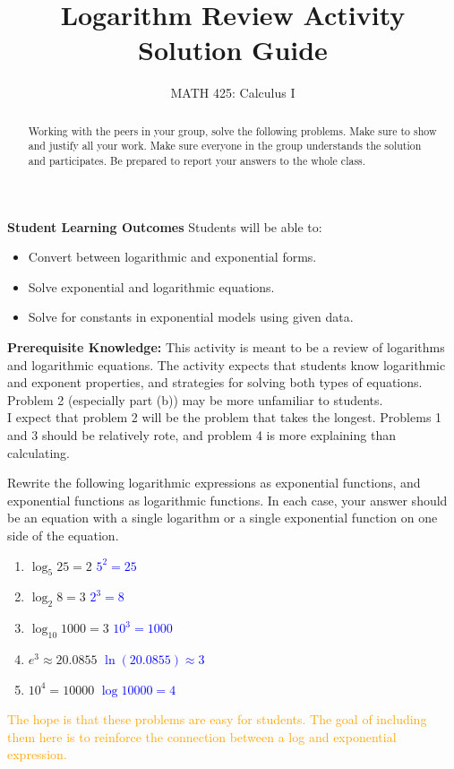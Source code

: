 \documentclass{ximera}
\title{Logarithm Review Activity Solution Guide}
\author{MATH 425: Calculus I}
\begin{document}
\begin{abstract}
   Working with the peers in your group, solve the following problems. Make sure to show and justify all your work. Make sure everyone in the group understands the solution and participates. Be prepared to report your answers to the whole class. 
\end{abstract}
\maketitle

\textbf{Student Learning Outcomes}
Students will be able to: 
    \begin{itemize}
        \item Convert between logarithmic and exponential forms.
        \item Solve exponential and logarithmic equations.
        \item Solve for constants in exponential models using given data.
    \end{itemize}

\textbf{Prerequisite Knowledge:} This activity is meant to be a review of logarithms and logarithmic equations.  The activity expects that students know logarithmic and exponent properties, and strategies for solving both types of equations.  Problem 2 (especially part (b)) may be more unfamiliar to students.\\

I expect that problem 2 will be the problem that takes the longest.  Problems 1 and 3 should be relatively rote, and problem 4 is more explaining than calculating.

\begin{exercise}
    Rewrite the following logarithmic expressions as exponential functions, and exponential functions as logarithmic functions.  In each case, your answer should be an equation with a single logarithm or a single exponential function on one side of the equation.
    \begin{enumerate}
        \item $\log_5 25=2$ \textcolor{blue}{$5^2=25$}
        \item $\log_2 8=3$ \textcolor{blue}{$2^3=8$}
        \item $\log_{10} 1000=3$ \textcolor{blue}{$10^3=1000$}
        \item $e^3\approx 20.0855$ \textcolor{blue}{$\ln(20.0855)\approx 3$}
        \item $10^4=10000$ \textcolor{blue}{$\log 10000=4$}
    \end{enumerate}
    \textcolor{orange}{The hope is that these problems are easy for students. The goal of including them here is to reinforce the connection between a log and exponential expression.}
\end{exercise}
\end{document}
